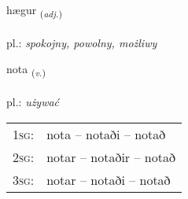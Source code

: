 \documentclass[frontgrid, backgrid]{flacards}\usepackage[]{graphicx}\usepackage[]{xcolor}
\begin{document}
{hægur \small{\textsubscript{(\textit{adj.})}} \\[1ex] %
\textphonetic{[haiːɣʏr]} \\
pl.: \emph{spokojny, powolny, możliwy} \\  [2ex]
\renewcommand*{\arraystretch}{0.8}
}

\renewcommand{\flhead}{\vskip5pt \fboxsep=0pt {\small\bfseries\footnotesize Sagnorð | Verb}}
\renewcommand{\fcfoot}{\vskip5pt \fboxsep=0pt \hspace{2pt}{\small\bfseries\footnotesize 1K}}

\renewcommand{\blhead}{\vskip5pt {\small\bfseries\footnotesize Sagnorð | Verb }}
\renewcommand{\bcfoot}{\vskip5pt \hspace{2pt}{\small\bfseries\footnotesize 1K}}


{nota \small{\textsubscript{(\textit{v.})}} \\[1ex] %
\textphonetic{[nɔːta]} \\
pl.: \emph{używać} \\  [2ex]
\renewcommand*{\arraystretch}{0.8}
\begin{tabular}{p{1cm}l}
\textsc{1sg}: & nota -- notaði -- notað \\ 
\textsc{2sg}: & notar -- notaðir -- notað \\ 
\textsc{3sg}: & notar -- notaði -- notað \\ 
\end{tabular}
}

\renewcommand{\flhead}{\vskip5pt \fboxsep=0pt {\small\bfseries\footnotesize Fornafn | Pronoun}}
\renewcommand{\fcfoot}{\vskip5pt \fboxsep=0pt \hspace{2pt}{\small\bfseries\footnotesize 1K}}
\end{document}
